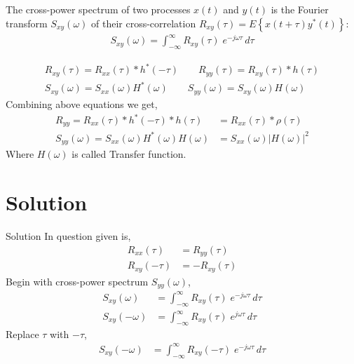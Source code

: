 \documentclass{beamer}
\providecommand{\cbrak}[1]{\ensuremath{\left\{#1\right\}}}
\begin{document}
\begin{frame}
   \begin{block}{}
   	  The cross-power spectrum of two processes $x(t)$ and $y(t)$ is the Fourier transform $S_{xy}(\omega)$ of their cross-correlation $R_{xy}(\tau) = E\cbrak{x(t+\tau)y^*(t)}$:
   	  \begin{align}
   	  	S_{xy}(\omega) = \int_{-\infty}^{\infty} R_{xy}(\tau)\; e^{-j\omega \tau} \, d\tau 
   	  \end{align}
   \end{block}
   
   \begin{block}{}
   	  \begin{align}
   	  	 R_{xy}(\tau) = R_{xx}(\tau)\ast h^*(-\tau) \qquad R_{yy}(\tau) = R_{xy}(\tau)\ast h(\tau) \\
   	  	S_{xy}(\omega) = S_{xx}(\omega)H^*(\omega) \qquad S_{yy}(\omega) = S_{xy}(\omega)H(\omega)
   	  \end{align}
   	  Combining above equations we get,
   	  \begin{align}
   	  	R_{yy} = R_{xx}(\tau)\ast h^*(-\tau)\ast h(\tau)  
   	  	      &= R_{xx}(\tau)\ast \rho(\tau) \\
   	  	S_{yy}(\omega) = S_{xx}(\omega)H^*(\omega) H(\omega)
   	  	   			  &= S_{xx}(\omega) |H(\omega)|^2 \label{eq12}
   	  \end{align}
   	  Where $H(\omega)$ is called Transfer function.
   \end{block}
\end{frame}


\section{Solution}
\begin{frame}{Solution}
	In question given is,
	\begin{align}
		 R_{xx}(\tau) &= R_{yy}(\tau)  \label{eq13} \\
	     R_{xy}(-\tau) &= -R_{xy}(\tau) \label{eq14}
	\end{align}
	Begin with cross-power spectrum $S_{yy}(\omega)$,
	\begin{align}
	   S_{xy}(\omega) &= \int_{-\infty}^{\infty} R_{xy}(\tau)\; e^{-j\omega \tau} \, d\tau \\
	   S_{xy}(-\omega) &= \int_{-\infty}^{\infty} R_{xy}(\tau)\; e^{j\omega \tau} \, d\tau 
	\end{align}
	Replace $\tau$ with $-\tau$,
	\begin{align}
	   S_{xy}(-\omega) &= \int_{-\infty}^{\infty} R_{xy}(-\tau)\; e^{-j\omega \tau} \, d\tau 
	\end{align}
      
\end{frame}
\end{document}
